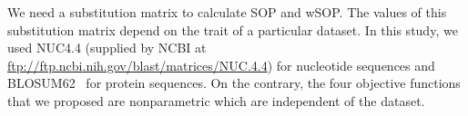 We need a substitution matrix to calculate SOP and wSOP. The values of this substitution matrix depend on the trait of a particular dataset. In this study, we used NUC4.4 (supplied by NCBI at \url{ftp://ftp.ncbi.nih.gov/blast/matrices/NUC.4.4}) for nucleotide sequences and BLOSUM62~\citep{henikoff1992amino} for protein sequences. On the contrary, the four objective functions that we proposed are nonparametric which are independent of the dataset.

